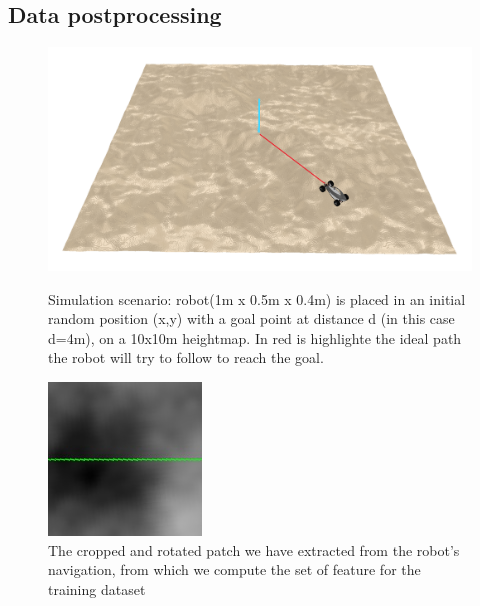 \documentclass[]{usiinfbachelorproject}
\begin{document}
\subsection{Data postprocessing}
\begin{figure}[h]
  \includegraphics[width=\linewidth]{3Dsim}
    \caption{Simulation scenario: robot(1m x 0.5m x 0.4m) is placed in an initial random position (x,y) with a goal point at distance d (in this case d=4m), on a 10x10m heightmap.
             In red is highlighte the ideal path the robot will try to follow to reach the goal.}\label{fig:3Dsim}
\endminipage\hfill
{}%
  \includegraphics[width=\linewidth]{rpatch}
  \caption{The cropped and rotated patch we have extracted from the robot's navigation, from which we compute the set of feature for the training dataset}\label{fig:rpatch}
\endminipage
\end{figure}
\end{document}
